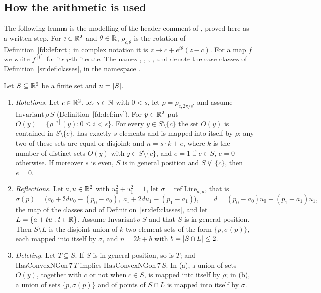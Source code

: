 \subsection{How the arithmetic is used}\label{sa:ssec:use}

The following lemma is the modelling of the header comment of , proved here as a written step.
For $c\in\mathbb R^2$ and $\theta\in\mathbb R$, $\rho_{c,\theta}$ is the rotation of Definition~\ref{fd:def:rot}; in complex
notation it is $z\mapsto c+e^{i\theta}(z-c)$. For a map $f$ we write $f^{[i]}$ for its $i$-th iterate. The names
, , , ,  and
 denote the case classes of Definition~\ref{sr:def:classes}, in the namespace
.

\begin{lemma}\label{sa:lem:model}
Let $S\subseteq\mathbb R^2$ be a finite set and $n=\lvert S\rvert$.
\begin{enumerate}[label=(\alph*)]
\item \emph{Rotations.} Let $c\in\mathbb R^2$, let $s\in\mathbb N$ with $0<s$, let $\rho=\rho_{c,2\pi/s}$, and assume
  $\mathrm{Invariant}\,\rho\,S$ \textup{(}Definition~\ref{fd:def:inv}\textup{)}. For $y\in\mathbb R^2$ put
  $O(y)=\{\rho^{[i]}(y):0\le i<s\}$. For every $y\in S\setminus\{c\}$ the set $O(y)$ is contained in
  $S\setminus\{c\}$, has exactly $s$ elements and is mapped into itself by $\rho$; any two of these sets are equal or
  disjoint; and $n=s\cdot k+e$, where $k$ is the number of distinct sets $O(y)$ with $y\in S\setminus\{c\}$, and $e=1$
  if $c\in S$, $e=0$ otherwise. If moreover $s$ is even, $S$ is in general position and $S\not\subseteq\{c\}$, then
  $e=0$.
\item \emph{Reflections.} Let $a,u\in\mathbb R^2$ with $u_0^2+u_1^2=1$, let $\sigma=\mathrm{reflLine}_{a,u}$, that is
  \[
  \sigma(p)=\bigl(a_0+2du_0-(p_0-a_0),\;a_1+2du_1-(p_1-a_1)\bigr),\qquad d=(p_0-a_0)u_0+(p_1-a_1)u_1,
  \]
  the map of the classes  and  of Definition~\ref{sr:def:classes}, and
  let $L=\{a+tu:t\in\mathbb R\}$. Assume $\mathrm{Invariant}\,\sigma\,S$ and that $S$ is in general position. Then
  $S\setminus L$ is the disjoint union of $k$ two-element sets of the form $\{p,\sigma(p)\}$, each mapped into itself
  by $\sigma$, and $n=2k+b$ with $b=\lvert S\cap L\rvert\le2$.
\item \emph{Deleting.} Let $T\subseteq S$. If $S$ is in general position, so is $T$; and
  $\mathrm{HasConvexNGon}\,7\,T$ implies $\mathrm{HasConvexNGon}\,7\,S$. In \textup{(a)}, a union of sets $O(y)$,
  together with $c$ or not when $c\in S$, is mapped into itself by $\rho$; in \textup{(b)}, a union of sets
  $\{p,\sigma(p)\}$ and of points of $S\cap L$ is mapped into itself by $\sigma$.
\end{enumerate}
\end{lemma}

